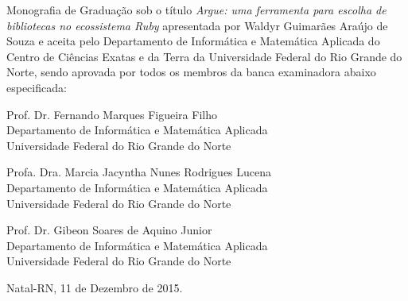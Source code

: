 \begin{folhadeaprovacao}
	\setlength{\ABNTsignthickness}{0.4pt}
	\setlength{\ABNTsignwidth}{10cm}
	
	\noindent 
	Monografia de Graduação sob o título \textit{Argue: uma ferramenta para escolha de bibliotecas no ecossistema Ruby} apresentada por 
	Waldyr Guimarães Araújo de Souza e aceita pelo Departamento de Informática e Matemática Aplicada do
	Centro de Ciências Exatas e da Terra da Universidade Federal do Rio Grande do Norte,
	sendo aprovada por todos os membros da banca examinadora abaixo especificada:
		
	\assinatura
	{
		{\small Prof. Dr. Fernando Marques Figueira Filho} 															\\ 
		{\footnotesize
			Departamento de Informática e Matemática Aplicada 																	\\
		  	Universidade Federal do Rio Grande do Norte
		}
	}
		
	\assinatura
	{
		Profa. Dra. Marcia Jacyntha Nunes Rodrigues Lucena 						 \\ 
		{\footnotesize
			Departamento de Informática e Matemática Aplicada 																	 \\
		  	Universidade Federal do Rio Grande do Norte
		}
	}
		
	\assinatura
	{
		Prof. Dr. Gibeon Soares de Aquino Junior 						 \\ 
		{\footnotesize
			Departamento de Informática e Matemática Aplicada 																	 \\
		  	Universidade Federal do Rio Grande do Norte
		}
	}
		
	\vfill
	
	\begin{center}
		Natal-RN, 11 de Dezembro de 2015.
	\end{center}
\end{folhadeaprovacao}